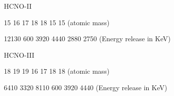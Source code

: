  \vspace{1cm}
 
 
 
 \hspace{3 cm} HCNO-II \\	
 \begin{center}
 \end{center}
 \vspace{-2mm}
 \hspace{4.5cm} {\scriptsize 15 \hspace{0.7cm} 16 \hspace{0.7cm} 17 \hspace{0.7cm} 18 \hspace{1.1cm} 18 \hspace{0.6cm} 15 \hspace{0.9cm} 15 \hfill (atomic mass) \\
 	
 	\vspace{-2mm}
 	
 	\hspace{4.4cm} 12130 \hspace{0.5cm}  600 \hspace{0.4cm}  3920 \hspace{0.6cm}  4440 \hspace{0.6cm}  2880 \hspace{0.5cm} 2750 \hfill (Energy release in KeV)}
 
 \vspace{1cm}
 
 
 
 \hspace{3 cm} HCNO-III 	
 \begin{center}
 \end{center}
 \vspace{-2mm}
 \hspace{4.5cm} {\scriptsize 18 \hspace{0.7cm} 19 \hspace{1.0cm} 19 \hspace{0.7cm} 16 \hspace{0.7cm} 17 \hspace{0.7cm} 18 \hspace{1.0cm} 18 \hfill (atomic mass) \\
 	
 	\vspace{-2mm}
 	
 	\hspace{4.4cm} 6410 \hspace{0.7cm}  3320 \hspace{0.5cm}  8110 \hspace{0.5cm}  600 \hspace{0.5cm}  3920 \hspace{0.6cm} 4440 \hfill (Energy release in KeV)}
 
